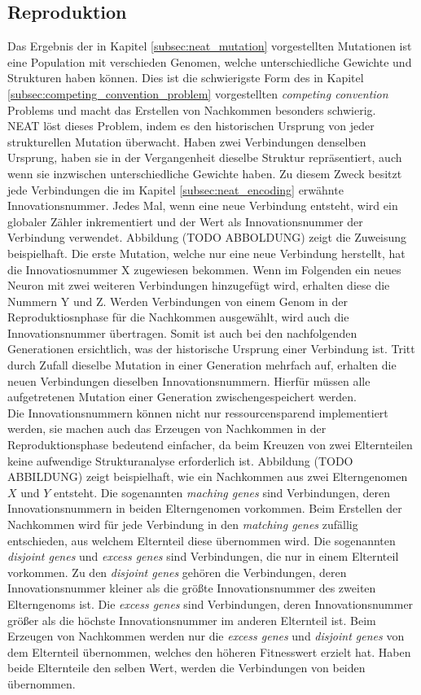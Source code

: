 \subsection{Reproduktion}
\label{subsec:neat_reproduction}
Das Ergebnis der in Kapitel \ref{subsec:neat_mutation} vorgestellten Mutationen ist eine Population mit verschieden Genomen, welche unterschiedliche Gewichte und Strukturen haben können. Dies ist die schwierigste Form des in Kapitel \ref{subsec:competing_convention_problem} vorgestellten \emph{competing convention} Problems und macht das Erstellen von Nachkommen besonders schwierig.\\
\ac{NEAT} löst dieses Problem, indem es den historischen Ursprung von jeder strukturellen Mutation überwacht. Haben zwei Verbindungen denselben Ursprung, haben sie in der Vergangenheit dieselbe Struktur repräsentiert, auch wenn sie inzwischen unterschiedliche Gewichte haben. Zu diesem Zweck besitzt jede Verbindungen die im Kapitel \ref{subsec:neat_encoding} erwähnte Innovationsnummer. Jedes Mal, wenn eine neue Verbindung entsteht, wird ein globaler Zähler inkrementiert und der Wert als Innovationsnummer der Verbindung verwendet. Abbildung (TODO ABBOLDUNG) zeigt die Zuweisung beispielhaft. Die erste Mutation, welche nur eine neue Verbindung herstellt, hat die Innovatiosnummer X zugewiesen bekommen. Wenn im Folgenden ein neues Neuron mit zwei weiteren Verbindungen hinzugefügt wird, erhalten diese die Nummern Y und Z. Werden Verbindungen von einem Genom in der Reproduktiosnphase für die Nachkommen ausgewählt, wird auch die Innovationsnummer übertragen. Somit ist auch bei den nachfolgenden Generationen ersichtlich, was der historische Ursprung einer Verbindung ist. Tritt durch Zufall dieselbe Mutation in einer Generation mehrfach auf, erhalten die neuen Verbindungen dieselben Innovationsnummern. Hierfür müssen alle aufgetretenen Mutation einer Generation zwischengespeichert werden. \\
Die Innovationsnummern können nicht nur ressourcensparend implementiert werden, sie machen auch das Erzeugen von Nachkommen in der Reproduktionsphase bedeutend einfacher, da beim Kreuzen von zwei Elternteilen keine aufwendige Strukturanalyse erforderlich ist. Abbildung (TODO ABBILDUNG) zeigt beispielhaft, wie ein Nachkommen aus zwei Elterngenomen $X$ und $Y$ entsteht. Die sogenannten \emph{maching genes} sind Verbindungen, deren Innovationsnummern in beiden Elterngenomen vorkommen. Beim Erstellen der Nachkommen wird für jede Verbindung in den \emph{matching genes} zufällig entschieden, aus welchem Elternteil diese übernommen wird. Die sogenannten \emph{disjoint genes} und \emph{excess genes} sind Verbindungen, die nur in einem Elternteil vorkommen. Zu den \emph{disjoint genes} gehören die Verbindungen, deren Innovationsnummer kleiner als die größte Innovationsnummer des zweiten Elterngenoms ist. Die \emph{excess genes} sind Verbindungen, deren Innovationsnummer größer als die höchste Innovationsnummer im anderen Elternteil ist. Beim Erzeugen von Nachkommen werden nur die \emph{excess genes} und \emph{disjoint genes} von dem Elternteil übernommen, welches den höheren Fitnesswert erzielt hat. Haben beide Elternteile den selben Wert, werden die Verbindungen von beiden übernommen.
